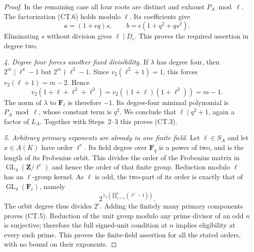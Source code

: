 \documentclass[11pt,a4paper]{article}
\begin{document}
\begin{proof}
In the remaining case all four roots are distinct and exhaust
$P_A\bmod\ell$. The factorization (CT.6) holds modulo $\ell$.
Its coefficients give
\[
        a=(1+\epsilon q)s,\qquad
        b=\epsilon(1+q^2+qs^2).
 \tag{CT.10}
\]
Eliminating $s$ without division gives $\ell\mid D_\epsilon$.
This proves the required assertion in degree two.

\emph{4. Degree four forces another fixed divisibility.}
If $\lambda$ has degree four, then
$2^m\mid\ell^4-1$ but $2^m\nmid\ell^2-1$.
Since $v_2(\ell^2+1)=1$, this forces
$v_2(\ell+1)=m-2$. Hence
\[
 v_2(1+\ell+\ell^2+\ell^3)
       =v_2((1+\ell)(1+\ell^2))=m-1.
\]
The norm of $\lambda$ to $\mathbf F_\ell$ is therefore $-1$.
Its degree-four minimal polynomial is $P_A\bmod\ell$, whose
constant term is $q^2$. We conclude that
$\ell\mid q^2+1$, again a factor of $L_A$.
Together with Steps~2--3 this proves (CT.3).

\emph{5. Arbitrary primary exponents are already in one finite field.}
Let $\ell\in S_A$ and let $x\in A(K)$ have order $\ell^r$.
Its field degree over $\mathbf F_q$ is a power of two, and is
the length of its Frobenius orbit. This divides the order of
the Frobenius matrix in
$\operatorname{GL}_4(\mathbf Z/\ell^r)$ and hence the order of
that finite group. Reduction modulo $\ell$ has an $\ell$-group
kernel. As $\ell$ is odd, the two-part of its order is exactly
that of $\operatorname{GL}_4(\mathbf F_\ell)$, namely
\[
        2^{\,v_2(\prod_{j=1}^4(\ell^j-1))}.
 \tag{CT.11}
\]
The orbit degree thus divides $2^e$. Adding the finitely many
primary components proves (CT.5). Reduction of the unit group
modulo any prime divisor of an odd $n$ is surjective; therefore
the full signed-unit condition at $n$ implies eligibility at
every such prime. This proves the finite-field assertion for
all the stated orders, with no bound on their exponents.


\end{proof}
\end{document}
